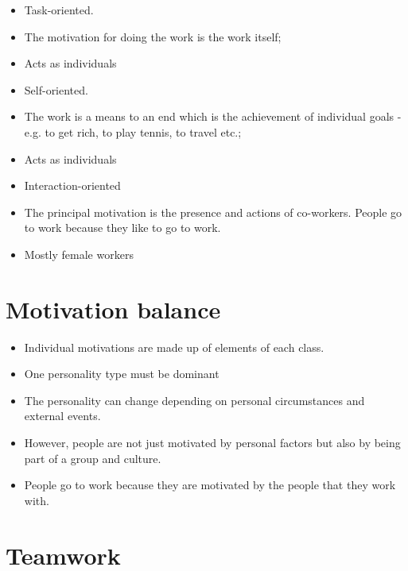 \begin{itemize}
\item Task-oriented.

  \item The motivation for doing the work is the work itself;   \item Acts as individuals
\item Self-oriented.

  \item The work is a means to an end which is the achievement of individual goals - e.g. to get rich, to play tennis, to travel etc.;
  \item Acts as individuals \item Interaction-oriented
  \item The principal motivation is the presence and actions of co-workers. People go to work because they like to go to work.
  \item Mostly female workers

\end{itemize}
\section{ Motivation balance}
\begin{itemize}


\item Individual motivations are made up of elements of each class.

  \item One personality type must be dominant

\item The personality can change depending on personal circumstances and external events.

\item However, people are not just motivated by personal factors but also by being part of a group and culture.

\item People go to work because they are motivated by the people that they work with.

\end{itemize}
\section{ Teamwork}

